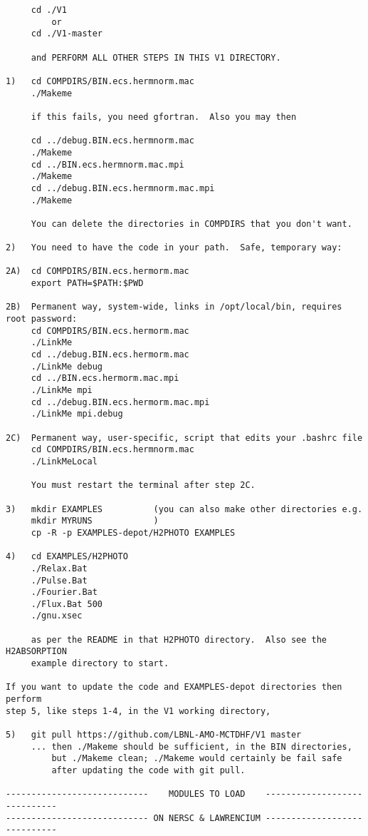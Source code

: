 \begin{verbatim}
     cd ./V1
         or
     cd ./V1-master

     and PERFORM ALL OTHER STEPS IN THIS V1 DIRECTORY.

1)   cd COMPDIRS/BIN.ecs.hermnorm.mac
     ./Makeme

     if this fails, you need gfortran.  Also you may then

     cd ../debug.BIN.ecs.hermnorm.mac
     ./Makeme
     cd ../BIN.ecs.hermnorm.mac.mpi
     ./Makeme
     cd ../debug.BIN.ecs.hermnorm.mac.mpi
     ./Makeme

     You can delete the directories in COMPDIRS that you don't want.

2)   You need to have the code in your path.  Safe, temporary way:

2A)  cd COMPDIRS/BIN.ecs.hermorm.mac
     export PATH=$PATH:$PWD

2B)  Permanent way, system-wide, links in /opt/local/bin, requires root password:
     cd COMPDIRS/BIN.ecs.hermorm.mac
     ./LinkMe
     cd ../debug.BIN.ecs.hermorm.mac
     ./LinkMe debug
     cd ../BIN.ecs.hermorm.mac.mpi
     ./LinkMe mpi
     cd ../debug.BIN.ecs.hermorm.mac.mpi
     ./LinkMe mpi.debug

2C)  Permanent way, user-specific, script that edits your .bashrc file
     cd COMPDIRS/BIN.ecs.hermnorm.mac
     ./LinkMeLocal

     You must restart the terminal after step 2C.

3)   mkdir EXAMPLES          (you can also make other directories e.g. 
     mkdir MYRUNS            )
     cp -R -p EXAMPLES-depot/H2PHOTO EXAMPLES

4)   cd EXAMPLES/H2PHOTO
     ./Relax.Bat
     ./Pulse.Bat
     ./Fourier.Bat 
     ./Flux.Bat 500
     ./gnu.xsec

     as per the README in that H2PHOTO directory.  Also see the H2ABSORPTION
     example directory to start.
 
If you want to update the code and EXAMPLES-depot directories then perform 
step 5, like steps 1-4, in the V1 working directory,

5)   git pull https://github.com/LBNL-AMO-MCTDHF/V1 master
     ... then ./Makeme should be sufficient, in the BIN directories,
         but ./Makeme clean; ./Makeme would certainly be fail safe
         after updating the code with git pull.

----------------------------    MODULES TO LOAD    -----------------------------
---------------------------- ON NERSC & LAWRENCIUM -----------------------------


\end{verbatim}
